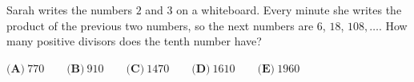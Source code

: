 Sarah writes the numbers $2$ and $3$ on a whiteboard. Every minute she writes the product of the previous two numbers, so the next numbers are $6$, $18$, $108,\dots$. How many positive divisors does the tenth number have?

$\textbf{(A)}\ 770\qquad\textbf{(B)}\ 910\qquad\textbf{(C)}\ 1470\qquad\textbf{(D)}\ 1610\qquad\textbf{(E)}\ 1960$
